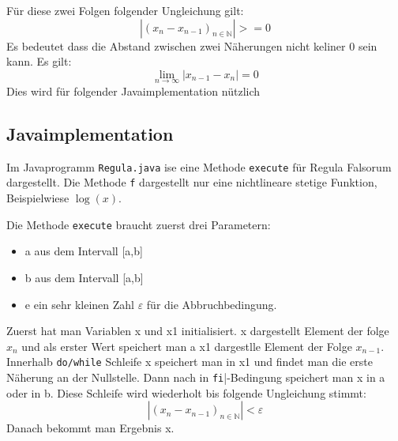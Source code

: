 Für diese zwei Folgen folgender Ungleichung gilt:
\begin{equation}
|(x_n -x_{ n - 1})_{n \in \mathbb{N} }| >= 0
\end{equation}
Es bedeutet dass die Abstand zwischen zwei Näherungen nicht keliner 0 sein kann. Es gilt:
\begin{equation}
\lim_{n \to \infty}|x_{n-1} - x_n| = 0
\end{equation}
Dies wird für folgender Javaimplementation nützlich

\subsection{Javaimplementation}
Im Javaprogramm  \verb|Regula.java| ise eine Methode \verb|execute| für Regula Falsorum dargestellt.
Die Methode \verb|f| dargestellt nur eine nichtlineare stetige Funktion, Beispielwiese $\log(x)$.

Die Methode \verb|execute| braucht zuerst drei Parametern:

\begin{itemize}
\item a aus dem Intervall [a,b]
\item b aus dem Intervall [a,b]
\item e ein sehr kleinen Zahl $\varepsilon$ für die Abbruchbedingung.
\end{itemize} 
Zuerst hat man Variablen x und x1 initialisiert.
x dargestellt Element der folge $x_n$ und als erster Wert speichert man a 
x1 dargestlle Element der Folge $x_{n-1}$.
Innerhalb  \verb|do/while| Schleife x speichert man in x1 und findet man die erste Näherung an der Nullstelle.
Dann nach in \verb|fi||-Bedingung speichert man x in a oder in b.
Diese Schleife wird wiederholt bis folgende Ungleichung stimmt:
\begin{equation}
|(x_n -x_{ n - 1})_{n \in \mathbb{N} }| < \varepsilon
\end{equation}
Danach bekommt man Ergebnis x.
